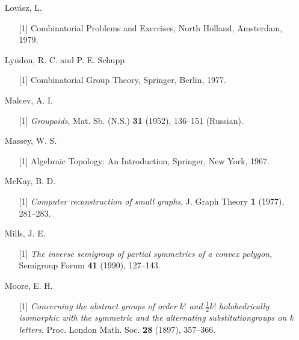 \documentclass{surv-l}
\numberwithin{equation}{section}
\numberwithin{table}{section}
\numberwithin{figure}{section}
\theoremstyle{definition}
\begin{document}
\begin{enumerate}
\item[] Lov\'{a}sz, L.
\begin{enumerate}
\item[\hypertarget{bib47}{[1]}] Combinatorial Problems and Exercises, North Holland,
Amsterdam, 1979.
\end{enumerate}

\item[] Lyndon, R. C. and P. E. Schupp
\begin{enumerate}
\item[\hypertarget{bib48}{[1]}] Combinatorial Group Theory, Springer, Berlin, 1977.
\end{enumerate}

\item[] Malcev, A. I.
\begin{enumerate}
\item[\hypertarget{bib49}{[1]}] \emph{Groupoids}, Mat. Sb. (N.S.) \textbf{31} (1952), 136--151
(Russian).
\end{enumerate}

\item[] Massey, W. S.
\begin{enumerate}
\item[\hypertarget{bib50}{[1]}] Algebraic Topology: An Introduction, Springer, New York,
1967.
\end{enumerate}

\item[] McKay, B. D.
\begin{enumerate}
\item[\hypertarget{bib51}{[1]}] \emph{Computer reconstruction of small graphs}, J.
Graph Theory \textbf{1} (1977), 281--283.
\end{enumerate}

\item[] Mills, J. E.
\begin{enumerate}
\item[\hypertarget{bib52}{[1]}] \emph{The inverse semigroup of partial symmetries of a
convex polygon}, Semigroup Forum \textbf{41} (1990),
127--143.
\end{enumerate}

\item[] Moore, E. H.
\begin{enumerate}
\item[\hypertarget{bib53}{[1]}] \emph{Concerning the abstract groups of order} $k!$
\emph{and} $\frac{1}{2}k!$ \emph{holohedrically isomorphic
with the symmetric and the alternating substitutiongroups
on k letters}, Proc. London Math. Soc. \textbf{28} (1897),
357--366.


\end{enumerate}
\end{enumerate}
\end{document}
